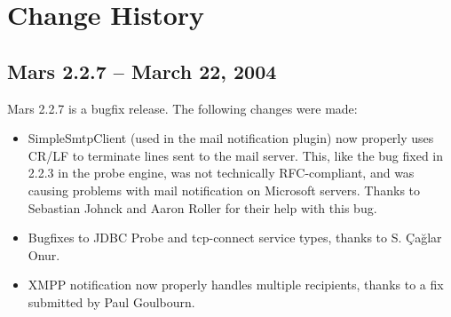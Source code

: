 \documentclass{article}
\begin{document}
\appendix
\section{Change History}
\subsection{Mars 2.2.7 -- March 22, 2004}
Mars 2.2.7 is a bugfix release. The following changes were made:
\begin{itemize}
\item SimpleSmtpClient (used in the mail notification plugin) now
  properly uses CR/LF to terminate lines sent to the mail
  server. This, like the bug fixed in 2.2.3 in the probe engine, was
  not technically RFC-compliant, and was causing problems with mail
  notification on Microsoft servers. Thanks to Sebastian Johnck and
  Aaron Roller for their help with this bug.
\item Bugfixes to JDBC Probe and tcp-connect service types, thanks to
  S. \c Ca\u glar Onur.
\item XMPP notification now properly handles multiple recipients,
  thanks to a fix submitted by Paul Goulbourn.
\end{itemize}
\end{document}
